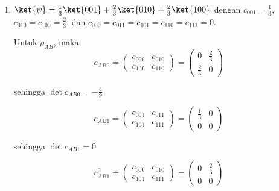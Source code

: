 \begin{enumerate}
	\begin{equation}
		\mathrm{Tr}\,\rho_{AC}\tilde{\rho}_{AC}=4\sin^2\theta \cos^2\theta \cos^2\varphi=4(\frac{5}{9})(\frac{4}{9})(\frac{1}{5})=\frac{16}{81}
	\end{equation}
	
	\begin{equation}
		\mathrm{Tr}\,\rho_{BC}\tilde{\rho}_{BC}=4\sin^4\theta \sin^2\varphi\cos^2\varphi=4(\frac{25}{81})(\frac{4}{5})(\frac{1}{5})=\frac{16}{81}
	\end{equation}
	
	\item { $\ket{\psi}=\frac{1}{3}\ket{001}+\frac{2}{3}\ket{010}+\frac{2}{3}\ket{100}$}
	dengan $c_{001}=\frac{1}{3}$, $c_{010}=c_{100}=\frac{2}{3}$, dan $c_{000}=c_{011}=c_{101}=c_{110}=c_{111}=0$.
	
	Untuk $\rho_{AB}$, maka
	\begin{equation}
		c_{AB0}=
		\begin{pmatrix}
			c_{000} & c_{010} \\
			c_{100} & c_{110}
		\end{pmatrix}=
		\begin{pmatrix}
			0 & \frac{2}{3} \\
			\frac{2}{3} & 0
		\end{pmatrix}
	\end{equation}
	
	sehingga $\det c_{AB0} = -\frac{4}{9}$
	
	\begin{equation}
		c_{AB1}=
		\begin{pmatrix}
			c_{001} & c_{011} \\
			c_{101} & c_{111}
		\end{pmatrix}=
		\begin{pmatrix}
			\frac{1}{3} & 0 \\
			0 & 0
		\end{pmatrix}
	\end{equation}
	
	sehingga $\det c_{AB1} = 0$
	
	\begin{equation}
		c_{AB1}^0=
		\begin{pmatrix}
			c_{000} & c_{010} \\
			c_{101} & c_{111}
		\end{pmatrix}=
		\begin{pmatrix}
			0 & \frac{2}{3} \\
			0 & 0
		\end{pmatrix}
	\end{equation}
	

\end{enumerate}
